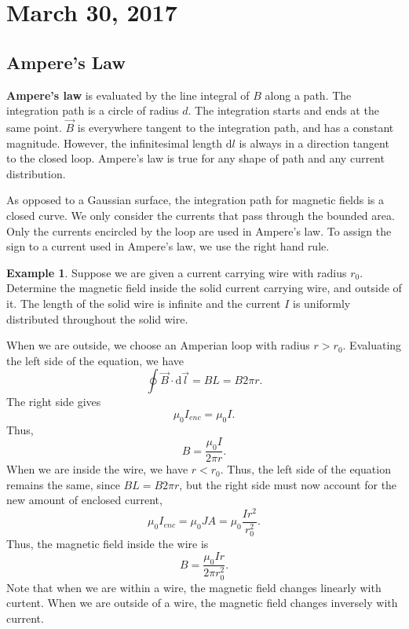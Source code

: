 \documentclass[11pt]{article}
\theoremstyle{plain} %
\theoremstyle{definition}
\theoremstyle{example}
\newtheorem*{example}{Example}
\theoremstyle{remark}
\begin{document}
\section{March 30, 2017}
\subsection{Ampere's Law}

\textbf{Ampere's law} is evaluated by the line integral of $B$ along a path. The integration path is a circle of radius $d$. The integration starts and ends at the same point. $\vec{B}$ is everywhere tangent to the integration path, and has a constant magnitude. However, the infinitesimal length $\mathrm d l$ is always in a direction tangent to the closed loop. Ampere's law is true for any shape of path and any current distribution. 

As opposed to a Gaussian surface, the integration path for magnetic fields is a closed curve. We only consider the currents that pass through the bounded area. Only the currents encircled by the loop are used in Ampere's law. To assign the sign to a current used in Ampere's law, we use the right hand rule.

\begin{example}
Suppose we are given a current carrying wire with radius $r_0$. Determine the magnetic field inside the solid current carrying wire, and outside of it. The length of the solid wire is infinite and the current $I$ is uniformly distributed throughout the solid wire. 
\end{example}

When we are outside, we choose an Amperian loop with radius $r>r_0$. Evaluating the left side of the equation, we have 
$$\oint \vec{B}\cdot \mathrm d \vec{l} = BL = B2\pi r.$$
The right side gives $$\mu_0I_{enc} = \mu_0I.$$
Thus, $$B = \frac{\mu_0I}{2\pi r}.$$
When we are inside the wire, we have $r<r_0$. Thus, the left side of the equation remains the same, since $BL = B2\pi r$, but the right side must now account for the new amount of enclosed current,
$$\mu_0I_{enc} = \mu_0JA = \mu_0\frac{Ir^2}{r_0^2}.$$
Thus, the magnetic field inside the wire is 
$$B = \frac{\mu_0Ir}{2\pi r_0^2}.$$
Note that when we are within a wire, the magnetic field changes linearly with curtent. When we are outside of a wire, the magnetic field changes inversely with current. 
\end{document}
